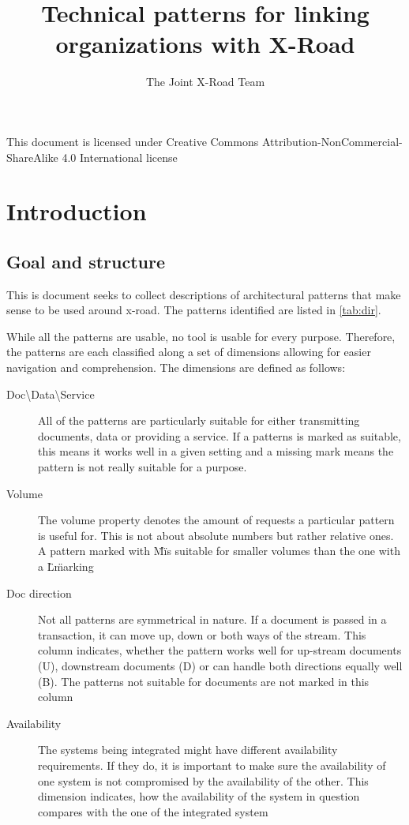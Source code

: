 \documentclass[10pt,a4paper]{article}
\title{Technical patterns for linking organizations with X-Road}
\author{The Joint X-Road Team}
\begin{document}
\maketitle
\clearpage
\setcounter{tocdepth}{1}
\tableofcontents
\clearpage
\thispagestyle{empty}
\null
\vfill

\begin{center}
This document is licensed under Creative Commons Attribution-NonCommercial-ShareAlike 4.0 International license\\[5mm]

\ccbyncsa\end{center}
\clearpage

\setcounter{section}{0}
\section{Introduction}
\subsection{Goal and structure}
This is document seeks to collect descriptions of architectural patterns that make sense to be used around x-road. The patterns identified are listed in \ref{tab:dir}. 

While all the patterns are usable, no tool is usable for every purpose. Therefore, the patterns are each classified along a set of dimensions allowing for easier navigation and comprehension. The dimensions are defined as follows:
\begin{description}
	\item[Doc\textbackslash Data\textbackslash Service] All of the patterns are particularly suitable for either transmitting documents, data or providing a service. If a patterns is marked as suitable, this means it works well in a given setting and a missing mark means the pattern is not really suitable for a purpose. 
	\item[Volume] The volume property denotes the amount of requests a particular pattern is useful for. This is not about absolute numbers but rather relative ones. A pattern marked with \"M\" is suitable for smaller volumes than the one with a \"L\" marking
	\item[Doc direction] Not all patterns are symmetrical in nature. If a document is passed in a transaction, it can move up, down or both ways of the stream. This column indicates, whether the pattern works well for up-stream documents (U), downstream documents (D) or can handle both directions equally well (B). The patterns not suitable for documents are not marked in this column
	 \item[Availability] The systems being integrated might have different availability requirements. If they do, it is important to make sure the availability of one system is not compromised by the availability of the other. This dimension indicates, how the availability of the system in question compares with the one of the integrated system
\end{description}
\end{document}
